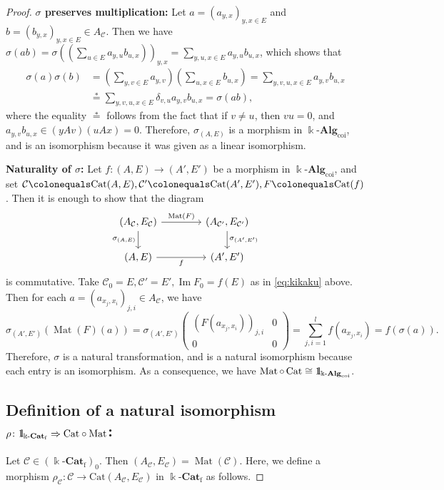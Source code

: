 \documentclass{surv-l}
\numberwithin{equation}{chapter}
\numberwithin{figure}{chapter}
\theoremstyle{plain}
\theoremstyle{definition}
\theoremstyle{remark}
\newcommand{\id}{1\kern-.25em{\text{{\rm l}}}}
\newcommand{\kCat}{\Bbbk\text{-}\mathbf{Cat}}
\newcommand{\Ar}[3]{\ar[from={#1}, to={#2}, #3]}
\DeclareMathOperator{\Mat}{Mat}
\begin{document}
\begin{proof}
{\bf $\sigma$ preserves multiplication:}
Let $a= (a_{y,x})_{y,x\in E}$ and $b= (b_{y,x})_{y,x\in E} \in A_{\mathcal{C}}$.
Then we have
$\sigma(ab) = \sigma((\sum_{u\in E} a_{y,u}b_{u,x}))_{y,x}
= \sum_{y,u,x\in E} a_{y,u}b_{u,x}$, which shows that
\[
\begin{aligned}
\sigma(a)\sigma(b) &= \left(\sum_{y,v\in E}a_{y,v}\right) \left(\sum_{u,x\in E}b_{u,x}\right) = \sum_{y,v,u,x\in E}a_{y,v}b_{u,x}\\
&\overset{*}{=}
\sum_{y,v,u,x\in E}\delta_{v,u}a_{y,v}b_{u,x}=\sigma(ab),
\end{aligned}
\]
where the equality $\overset{*}{=}$ follows from the fact that if $v \ne u$,
then $vu = 0$, and $a_{y,v}b_{u,x}\in (yAv)(uAx) = 0$.
Therefore,
$\sigma_{(A,E)}$ is a morphism in $\Bbbk\text{-}\mathbf{Alg}_{\mathrm{coi}}$, and is an isomorphism because it was given as a linear isomorphism.

{\bf Naturality of $\sigma$:}
Let $f \colon (A,E) \to (A',E')$ be a morphism in $\Bbbk\text{-}\mathbf{Alg}_{\mathrm{coi}}$, and set
${\mathcal{C}}\colonequals  \mathrm{Cat}(A,E), {\mathcal{C}}'\colonequals  \mathrm{Cat}(A',E'), F\colonequals  \mathrm{Cat}(f)$.
Then it is enough to show that the diagram
\[
\begin{tikzcd}[column sep=40]
(A_{\mathcal{C}}, E_{\mathcal{C}}) & (A_{{\mathcal{C}}'}, E_{{\mathcal{C}}'})\\
(A,E) & (A',E')
\Ar{1-1}{1-2}{"\Mat(F)"}
\Ar{2-1}{2-2}{"f"'}
\Ar{1-1}{2-1}{"\sigma_{(A,E)}"'}
\Ar{1-2}{2-2}{"\sigma_{(A',E')}"}
\end{tikzcd}
\]
is commutative.
Take ${\mathcal{C}}_0 = E, {\mathcal{C}}' =E', \operatorname{Im} F_0 = f(E)$ as in \eqref{eq:kikaku} above.
Then for each $a=(a_{x_j,x_i})_{j,i} \in A_{\mathcal{C}}$, we have
\[
\sigma_{(A',E')}(\Mat(F)(a))
= \sigma_{(A',E')}\begin{pmatrix} (F(a_{x_j,x_i}))_{j,i} & 0\\0 & 0 \end{pmatrix}
= \sum_{j,i=1}^l f(a_{x_j,x_i}) = f(\sigma(a)).
\]
Therefore, $\sigma$ is a natural transformation, and is a natural isomorphism because
each entry is an isomorphism.
As a consequence, we have $\Mat\circ \, \mathrm{Cat} \cong \id_{\Bbbk\text{-}\mathbf{Alg}_{\mathrm{coi}}}$.


\subsection*{Definition of a natural isomorphism $\rho \colon \id_{\kCat_{\mathrm{f}}} \Rightarrow \mathrm{Cat} \circ \Mat$:}
Let ${\mathcal{C}} \in (\kCat_{\mathrm{f}})_0$.
Then $(A_{\mathcal{C}}, E_{\mathcal{C}}) = \Mat({\mathcal{C}})$.
Here, we define a morphism $\rho_{\mathcal{C}} \colon {\mathcal{C}} \to \mathrm{Cat}(A_{\mathcal{C}}, E_{\mathcal{C}})$ in $\kCat_{\mathrm{f}}$
as follows.


\end{proof}
\end{document}
